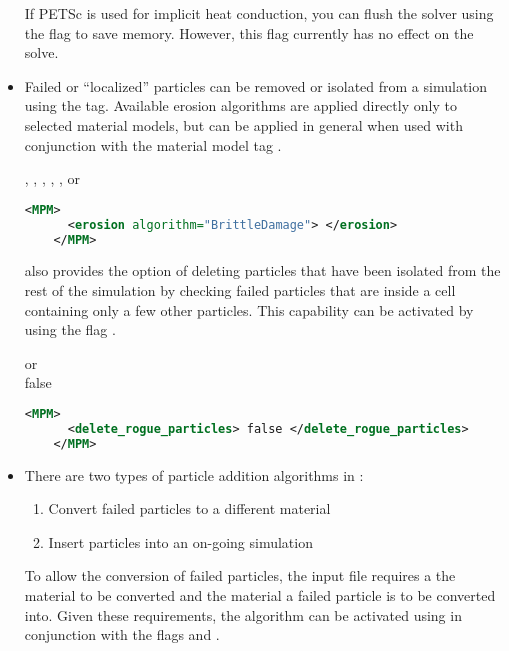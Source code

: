 \begin{itemize}
    If PETSc is used for implicit heat conduction, you can flush the solver
    using the  flag to save memory.  However, this flag 
    currently has no effect on the solve.

  \item {}  Failed or ``localized'' particles can be
    removed or isolated from a simulation using the  tag.
    Available erosion algorithms are applied directly only to selected material models,
    but can be applied in general when used with conjunction with the
    material model tag .

     , ,
                       , ,
                       , or \\
     
    \begin{lstlisting}[language=XML]
    <MPM>
      <erosion algorithm="BrittleDamage"> </erosion>
    </MPM>
    \end{lstlisting}

    \Vaango also provides the option of deleting particles that have been isolated from
    the rest of the simulation by checking failed particles that are inside a cell
    containing only a few other particles.  This capability can be activated by
    using the flag .

      or \\
     false
    \begin{lstlisting}[language=XML]
    <MPM>
      <delete_rogue_particles> false </delete_rogue_particles>
    </MPM>
    \end{lstlisting}

  \item {} There are two types of particle
    addition algorithms in \Vaango:
    \begin{enumerate}
      \item Convert failed particles to a different material
      \item Insert particles into an on-going simulation
    \end{enumerate}
   
    To allow the conversion of failed particles, the input file requires a
    the material to be converted and the material a failed particle is to be
    converted into.  Given these requirements, the algorithm can be activated
    using  in conjunction with the flags
     and .
   

\end{itemize}
